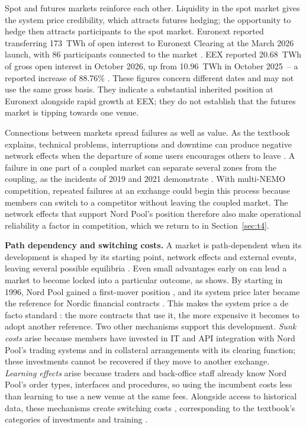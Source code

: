 Spot and futures markets reinforce each other. Liquidity in the spot market gives the system price credibility, which attracts futures hedging; the opportunity to hedge then attracts participants to the spot market. Euronext reported transferring 173~TWh of open interest to Euronext Clearing at the March 2026 launch, with 86 participants connected to the market \citep{Euronext2026}. EEX reported 20.68~TWh of gross open interest in October 2026, up from 10.96~TWh in October 2025~-- a reported increase of 88.76\% \citep[slide~17]{EEX2026}. These figures concern different dates and may not use the same gross basis. They indicate a substantial inherited position at Euronext alongside rapid growth at EEX; they do not establish that the futures market is tipping towards one venue.

Connections between markets spread failures as well as value. As the textbook explains, technical problems, interruptions and downtime can produce negative network effects when the departure of some users encourages others to leave \citep[Section~9.2]{OverbyAudestad2021}. A failure in one part of a coupled market can separate several zones from the coupling, as the incidents of 2019 and 2021 demonstrate \citep{NPIncident2019,SDAC2021}. With multi-NEMO competition, repeated failures at an exchange could begin this process because members can switch to a competitor without leaving the coupled market. The network effects that support Nord Pool's position therefore also make operational reliability a factor in competition, which we return to in Section~\ref{sec:t4}.

\textbf{Path dependency and switching costs.} A market is path-dependent when its development is shaped by its starting point, network effects and external events, leaving several possible equilibria \citep[Def.~11.2]{OverbyAudestad2021}. Even small advantages early on can lead a market to become locked into a particular outcome, as \citet{Arthur1989} shows. By starting in 1996, Nord Pool gained a first-mover position \citep{NPAbout}, and its system price later became the reference for Nordic financial contracts \citep{NPPrice}. This makes the system price a de facto standard \citep[Def.~15.1]{OverbyAudestad2021}: the more contracts that use it, the more expensive it becomes to adopt another reference. Two other mechanisms support this development. \emph{Sunk costs} arise because members have invested in IT and API integration with Nord Pool's trading systems and in collateral arrangements with its clearing function; these investments cannot be recovered if they move to another exchange. \emph{Learning effects} arise because traders and back-office staff already know Nord Pool's order types, interfaces and procedures, so using the incumbent costs less than learning to use a new venue at the same fees. Alongside access to historical data, these mechanisms create switching costs \citep[Def.~12.2]{OverbyAudestad2021}, corresponding to the textbook's categories of investments and training \citep[Section~12.3]{OverbyAudestad2021}.


